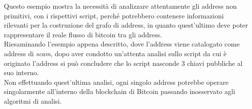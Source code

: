 \begin{example}
    Questo esempio mostra la necessità di analizzare attentamente gli address non primitivi, con i rispettivi script, perché potrebbero contenere informazioni rilevanti per la costruzione del grafo di address, in quanto quest'ultimo deve poter rappresentare il reale flusso di bitcoin tra gli address.\\
    Riesaminando l'esempio appena descritto, dove l'address  viene catalogato come address di \emph{scam}, dopo aver condotto un'attenta analisi sullo script da cui è originato l'address si può concludere che lo script nasconde 3 chiavi pubbliche al suo interno.\\
    Non effettuando quest'ultima analisi, ogni singolo address potrebbe operare singolarmente all'interno della blockchain di Bitcoin passando inosservato agli algoritmi di analisi.
 \end{example}

